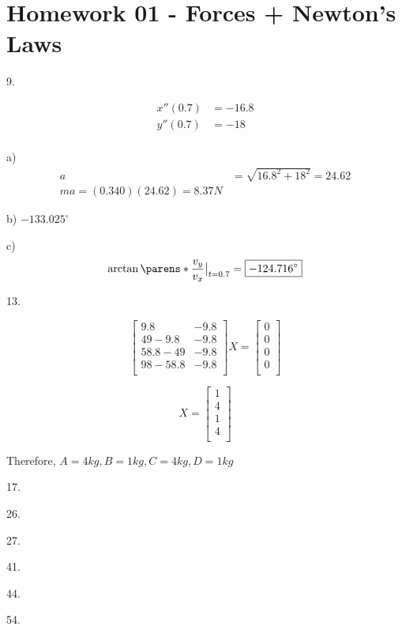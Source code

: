 \documentclass{scrreprt} %
\begin{document}
\section{Homework 01 - Forces + Newton's Laws}

9.

\begin{align*}
	x''(0.7) &= -16.8 \\
	y''(0.7) &= -18 \\
\end{align*}

a) \begin{align*}
a &= \sqrt{16.8^2 + 18^2} = 24.62 \\
ma = (0.340)(24.62) = \boxed{8.37 N}
\end{align*}

b) $-133.025^\circ$

c) $$\evalat{\arctan \parens*{\frac{v_y}{v_x}}}{t = 0.7} = \boxed{-124.716^\circ}$$

13.

$$
\begin{bmatrix}
	9.8 & - 9.8 \\
	49 - 9.8 & -9.8 \\
	58.8 - 49 & -9.8 \\
	98 - 58.8 & -9.8 \\
\end{bmatrix}
X
=
\begin{bmatrix}
	0 \\
	0 \\
	0 \\
	0 \\
\end{bmatrix}
$$

$$
X = \begin{bmatrix}
	1 \\
	4 \\
	1 \\
	4 \\
\end{bmatrix}
$$

Therefore, $A = 4 kg, B = 1 kg, C = 4 kg, D = 1 kg$

17.

26.

27.

41.

44.

54.
\end{document}
